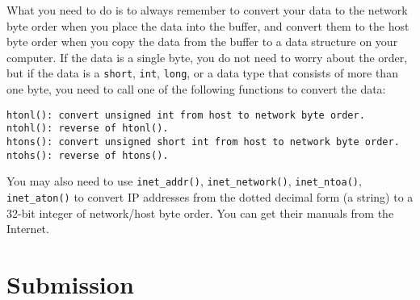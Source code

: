 What you need to do is to always remember to convert your data to the
network byte order when you place the data into the buffer, and convert
them to the host byte order when you copy the data from the buffer to 
a data structure on your computer. If the data is a single byte, you do not
need to worry about the order, but if the data is a {\tt short}, 
{\tt int}, {\tt long}, or a data type that consists of more than one byte, 
you need to call one of the following functions to convert the data:

\begin{lstlisting}
htonl(): convert unsigned int from host to network byte order.
ntohl(): reverse of htonl().
htons(): convert unsigned short int from host to network byte order.
ntohs(): reverse of htons().
\end{lstlisting}


You may also need to use {\tt inet\_addr()}, {\tt inet\_network()},
{\tt inet\_ntoa()}, {\tt inet\_aton()} to convert 
IP addresses from the dotted decimal form (a string) to a
32-bit integer of network/host byte order. You can get their 
manuals from the Internet.


 

\section{Submission}









